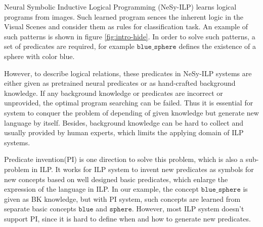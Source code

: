 \documentclass[
]{ceurart}
\begin{document}
Neural Symbolic Inductive Logical Programming (NeSy-ILP) learns logical programs from images. 
Such learned program sences the inherent logic in the Visual Scenes and consider them as rules for classification task.  An example of such patterns is shown in figure \ref{fig:intro-hide}. In order to solve such patterns, a set of predicates are required, for example $\mathtt{blue\_sphere} $ defines the existence of a sphere with color blue. 

However, to describe logical relations, these predicates in NeSy-ILP systems are either given as pretrained neural predicates or as hand-crafted background knowledge. 
If any background knowledge or predicates are incorrect or unprovided, the optimal program searching can be failed. Thus it is essential for system to conquer the problem of depending of given knowledge but generate new language by itself. Besides, background knowledge can be hard to collect and usually provided by human experts, which limits the applying domain of ILP systems.

Predicate invention(PI)\cite{pi1988} is one direction to solve this problem, which is also a sub-problem in ILP. It works for ILP system to invent new predicates as symbols for new concepts based on well designed basic predicates, which enlarge the expression of the language in ILP. In our example, the concept $ \mathtt{blue\_sphere} $ is given as BK knowledge, but with PI system, such concepts are learned from separate basic concepts $ \mathtt{blue} $ and $ \mathtt{sphere} $. However, most ILP system doesn't support PI, since it is hard to define when and how to generate new predicates. 

\end{document}

